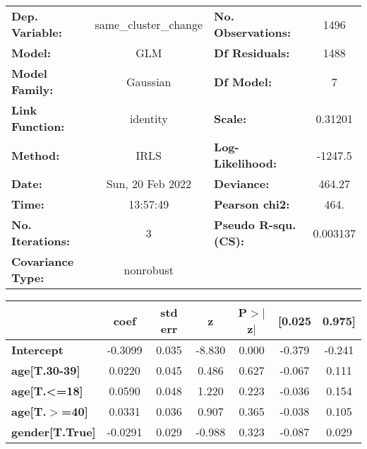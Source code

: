 \begin{center}
\begin{tabular}{lclc}
\toprule
\textbf{Dep. Variable:}            & same\_cluster\_change & \textbf{  No. Observations:  } &     1496    \\
\textbf{Model:}                    &          GLM          & \textbf{  Df Residuals:      } &     1488    \\
\textbf{Model Family:}             &        Gaussian       & \textbf{  Df Model:          } &        7    \\
\textbf{Link Function:}            &        identity       & \textbf{  Scale:             } &   0.31201   \\
\textbf{Method:}                   &          IRLS         & \textbf{  Log-Likelihood:    } &   -1247.5   \\
\textbf{Date:}                     &    Sun, 20 Feb 2022   & \textbf{  Deviance:          } &    464.27   \\
\textbf{Time:}                     &        13:57:49       & \textbf{  Pearson chi2:      } &     464.    \\
\textbf{No. Iterations:}           &           3           & \textbf{  Pseudo R-squ. (CS):} &  0.003137   \\
\textbf{Covariance Type:}          &       nonrobust       & \textbf{                     } &             \\
\bottomrule
\end{tabular}
\begin{tabular}{lcccccc}
                                   & \textbf{coef} & \textbf{std err} & \textbf{z} & \textbf{P$> |$z$|$} & \textbf{[0.025} & \textbf{0.975]}  \\
\midrule
\textbf{Intercept}                 &      -0.3099  &        0.035     &    -8.830  &         0.000        &       -0.379    &       -0.241     \\
\textbf{age[T.30-39]}              &       0.0220  &        0.045     &     0.486  &         0.627        &       -0.067    &        0.111     \\
\textbf{age[T.<=18]}               &       0.0590  &        0.048     &     1.220  &         0.223        &       -0.036    &        0.154     \\
\textbf{age[T.$>$=40]}             &       0.0331  &        0.036     &     0.907  &         0.365        &       -0.038    &        0.105     \\
\textbf{gender[T.True]}            &      -0.0291  &        0.029     &    -0.988  &         0.323        &       -0.087    &        0.029     \\

\end{tabular}
\end{center}
